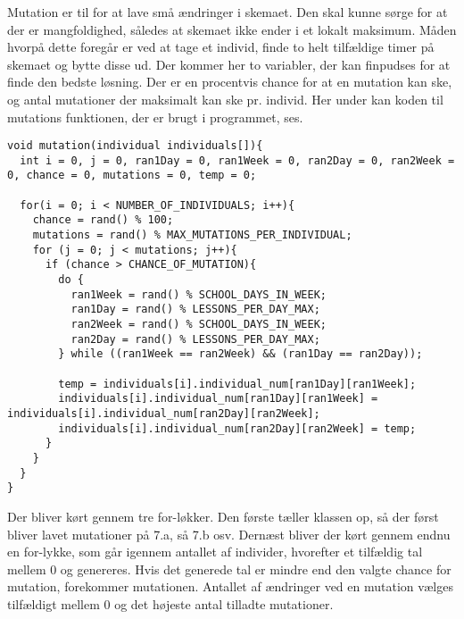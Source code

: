 Mutation er til for at lave små ændringer i skemaet. Den skal kunne sørge for at der er mangfoldighed, således at skemaet ikke ender i et lokalt maksimum. 
Måden hvorpå dette foregår er ved at tage et individ, finde to helt tilfældige timer på skemaet og bytte disse ud. Der kommer her to variabler, der kan finpudses for at finde den bedste løsning. Der er en procentvis chance for at en mutation kan ske, og antal mutationer der maksimalt kan ske pr. individ. 
Her under kan koden til mutations funktionen, der er brugt i programmet, ses.
\begin{lstlisting}
void mutation(individual individuals[]){
  int i = 0, j = 0, ran1Day = 0, ran1Week = 0, ran2Day = 0, ran2Week = 0, chance = 0, mutations = 0, temp = 0;

  for(i = 0; i < NUMBER_OF_INDIVIDUALS; i++){
    chance = rand() % 100;
    mutations = rand() % MAX_MUTATIONS_PER_INDIVIDUAL;
    for (j = 0; j < mutations; j++){
      if (chance > CHANCE_OF_MUTATION){
        do {
          ran1Week = rand() % SCHOOL_DAYS_IN_WEEK;
          ran1Day = rand() % LESSONS_PER_DAY_MAX;
          ran2Week = rand() % SCHOOL_DAYS_IN_WEEK;
          ran2Day = rand() % LESSONS_PER_DAY_MAX;
        } while ((ran1Week == ran2Week) && (ran1Day == ran2Day));
        
        temp = individuals[i].individual_num[ran1Day][ran1Week];
        individuals[i].individual_num[ran1Day][ran1Week] =        individuals[i].individual_num[ran2Day][ran2Week];
        individuals[i].individual_num[ran2Day][ran2Week] = temp;
      }
    }
  }
}
\end{lstlisting}

Der bliver kørt gennem tre for-løkker. Den første tæller klassen op, så der først bliver lavet mutationer på 7.a, så 7.b osv. Dernæst bliver der kørt gennem endnu en for-lykke, som går igennem antallet af individer, hvorefter et tilfældig tal mellem 0 og genereres. Hvis det generede tal er mindre end den valgte chance for mutation, forekommer mutationen. Antallet af ændringer ved en mutation vælges tilfældigt mellem 0 og det højeste antal tilladte mutationer.